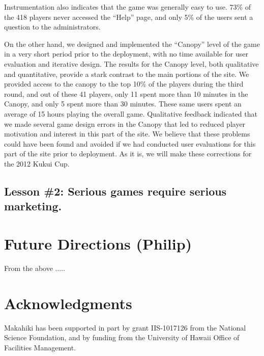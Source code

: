 \documentclass{acm_proc_article-sp}
\begin{document}
Instrumentation also indicates that the game was generally easy to
use. 73\% of the 418 players never accessed the ``Help'' page, and only 5\%
of the users sent a question to the administrators. 

On the other hand, we designed and implemented the ``Canopy'' level of the
game in a very short period prior to the deployment, with no time available
for user evaluation and iterative design.  The results for the Canopy
level, both qualitative and quantitative, provide a stark contrast to the
main portions of the site.  We provided access to the canopy to the top
10\% of the players during the third round, and out of these 41 players,
only 11 spent more than 10 minutes in the Canopy, and only 5 spent more
than 30 minutes. These same users spent an average of 15 hours playing the
overall game.  Qualitative feedback indicated that we made several game
design errors in the Canopy that led to reduced player motivation and
interest in this part of the site.  We believe that these problems could
have been found and avoided if we had conducted user evaluations for this
part of the site prior to deployment.  As it is, we will make these
corrections for the 2012 Kukui Cup.

\subsection{Lesson \#2: Serious games require serious marketing.}









\section{Future Directions (Philip)}
From the above .....

\section{Acknowledgments}
Makahiki has been supported in part by grant IIS-1017126 from the National
Science Foundation, and by funding from the University of Hawaii Office of Facilities
Management. 


  

\balancecolumns
\end{document}

